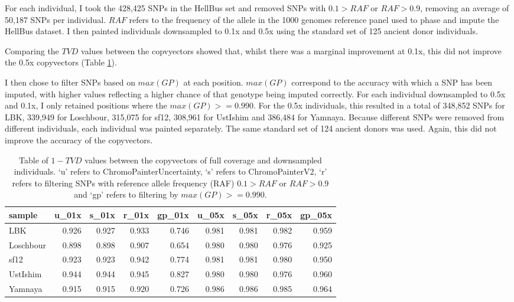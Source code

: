 {For each individual, I took the 428,425 SNPs in the HellBus set and removed SNPs with $0.1 > RAF$ or $RAF > 0.9$, removing an average of 50,187 SNPs per individual. $RAF$ refers to the frequency of the allele in the 1000 genomes reference panel used to phase and impute the HellBus dataset. I then painted individuals downsampled to 0.1x and 0.5x using the standard set of 125 ancient donor individuals.  

Comparing the $TVD$ values between the copvyectors showed that, whilst there was a marginal improvement at 0.1x, this did not improve the 0.5x copyvectors (Table \ref{tab:TVD_table}). 

I then chose to filter SNPs based on $max(GP)$ at each position. $max(GP)$ correspond to the accuracy with which a SNP has been imputed, with higher values reflecting a higher chance of that genotype being imputed correctly. For each individual downsampled to 0.5x and 0.1x, I only retained positions where the $max(GP) >= 0.990$. For the 0.5x individuals, this resulted in a total of 348,852 SNPs for LBK, 339,949 for Loschbour, 315,075 for sf12, 308,961 for UstIshim and 386,484 for Yamnaya. Because different SNPs were removed from different individuals, each individual was painted separately. The same standard set of 124 ancient donors was used. Again, this did not improve the accuracy of the copyvectors. 


\begin{table}
\centering
\begin{tabular}[t]{lrrrrrrrr}
\toprule
sample & u\_01x & s\_01x & r\_01x & gp\_01x & u\_05x & s\_05x & r\_05x & gp\_05x\\
\midrule
LBK & 0.926 & 0.927 & 0.933 & 0.746 & 0.981 & 0.981 & 0.982 & 0.959\\
Loschbour & 0.898 & 0.898 & 0.907 & 0.654 & 0.980 & 0.980 & 0.976 & 0.925\\
sf12 & 0.923 & 0.923 & 0.942 & 0.774 & 0.981 & 0.981 & 0.980 & 0.950\\
UstIshim & 0.944 & 0.944 & 0.945 & 0.827 & 0.980 & 0.980 & 0.976 & 0.960\\
Yamnaya & 0.915 & 0.915 & 0.920 & 0.726 & 0.986 & 0.986 & 0.985 & 0.964\\
\bottomrule
\end{tabular}
\caption{Table of $1-TVD$ values between the copyvectors of full coverage and downsampled individuals. `u' refers to ChromoPainterUncertainty, `s' refers to ChromoPainterV2, `r' refers to filtering SNPs with reference allele frequency (RAF) $0.1 > RAF$ or $RAF > 0.9$ and `gp' refers to filtering by $max(GP) >= 0.990$.}
\label{tab:TVD_table}
\end{table}


}

